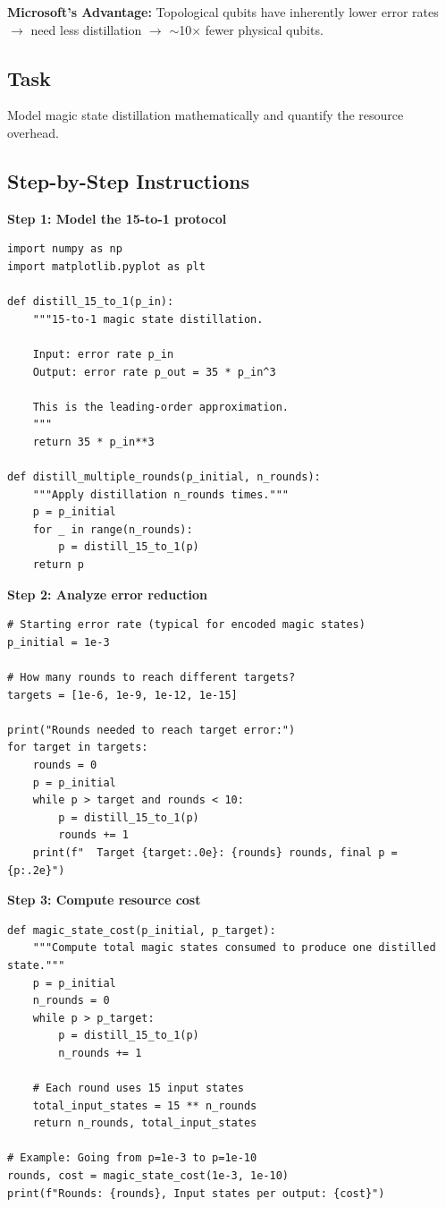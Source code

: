 \documentclass[11pt,a4paper]{article}
\begin{document}
\textbf{Microsoft's Advantage:} Topological qubits have inherently lower error rates $\to$ need less distillation $\to$ $\sim$10$\times$ fewer physical qubits.

\subsection*{Task}
Model magic state distillation mathematically and quantify the resource overhead.

\subsection*{Step-by-Step Instructions}

\textbf{Step 1: Model the 15-to-1 protocol}
\begin{lstlisting}
import numpy as np
import matplotlib.pyplot as plt

def distill_15_to_1(p_in):
    """15-to-1 magic state distillation.
    
    Input: error rate p_in
    Output: error rate p_out = 35 * p_in^3
    
    This is the leading-order approximation.
    """
    return 35 * p_in**3

def distill_multiple_rounds(p_initial, n_rounds):
    """Apply distillation n_rounds times."""
    p = p_initial
    for _ in range(n_rounds):
        p = distill_15_to_1(p)
    return p
\end{lstlisting}

\textbf{Step 2: Analyze error reduction}
\begin{lstlisting}
# Starting error rate (typical for encoded magic states)
p_initial = 1e-3

# How many rounds to reach different targets?
targets = [1e-6, 1e-9, 1e-12, 1e-15]

print("Rounds needed to reach target error:")
for target in targets:
    rounds = 0
    p = p_initial
    while p > target and rounds < 10:
        p = distill_15_to_1(p)
        rounds += 1
    print(f"  Target {target:.0e}: {rounds} rounds, final p = {p:.2e}")
\end{lstlisting}

\textbf{Step 3: Compute resource cost}
\begin{lstlisting}
def magic_state_cost(p_initial, p_target):
    """Compute total magic states consumed to produce one distilled state."""
    p = p_initial
    n_rounds = 0
    while p > p_target:
        p = distill_15_to_1(p)
        n_rounds += 1
    
    # Each round uses 15 input states
    total_input_states = 15 ** n_rounds
    return n_rounds, total_input_states

# Example: Going from p=1e-3 to p=1e-10
rounds, cost = magic_state_cost(1e-3, 1e-10)
print(f"Rounds: {rounds}, Input states per output: {cost}")
\end{lstlisting}
\end{document}
